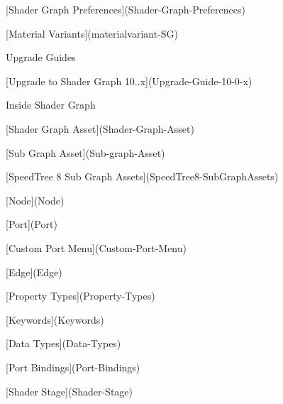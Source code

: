 \begin{DoxyItemize}
\begin{DoxyItemize}
\item \mbox{[}Shader Graph Preferences\mbox{]}(Shader-\/\+Graph-\/\+Preferences)
\item {}
\item \mbox{[}Material Variants\mbox{]}(materialvariant-\/\+SG)
\end{DoxyItemize}
\item Upgrade Guides
\begin{DoxyItemize}
\item \mbox{[}Upgrade to Shader Graph 10..\+x\mbox{]}(Upgrade-\/\+Guide-\/10-\/0-\/x)
\end{DoxyItemize}
\item Inside Shader Graph
\begin{DoxyItemize}
\item \mbox{[}Shader Graph Asset\mbox{]}(Shader-\/\+Graph-\/\+Asset)
\item {}
\item \mbox{[}Sub Graph Asset\mbox{]}(Sub-\/graph-\/\+Asset)
\begin{DoxyItemize}
\item \mbox{[}Speed\+Tree 8 Sub Graph Assets\mbox{]}(Speed\+Tree8-\/\+Sub\+Graph\+Assets)
\end{DoxyItemize}
\item \mbox{[}Node\mbox{]}(Node)
\begin{DoxyItemize}
\item \mbox{[}Port\mbox{]}(Port)
\item \mbox{[}Custom Port Menu\mbox{]}(Custom-\/\+Port-\/\+Menu)
\item \mbox{[}Edge\mbox{]}(Edge)
\end{DoxyItemize}
\item \mbox{[}Property Types\mbox{]}(Property-\/\+Types)
\item \mbox{[}Keywords\mbox{]}(Keywords)
\item \mbox{[}Data Types\mbox{]}(Data-\/\+Types)
\item \mbox{[}Port Bindings\mbox{]}(Port-\/\+Bindings)
\item \mbox{[}Shader Stage\mbox{]}(Shader-\/\+Stage)
\item {}

\end{DoxyItemize}
\end{DoxyItemize}
